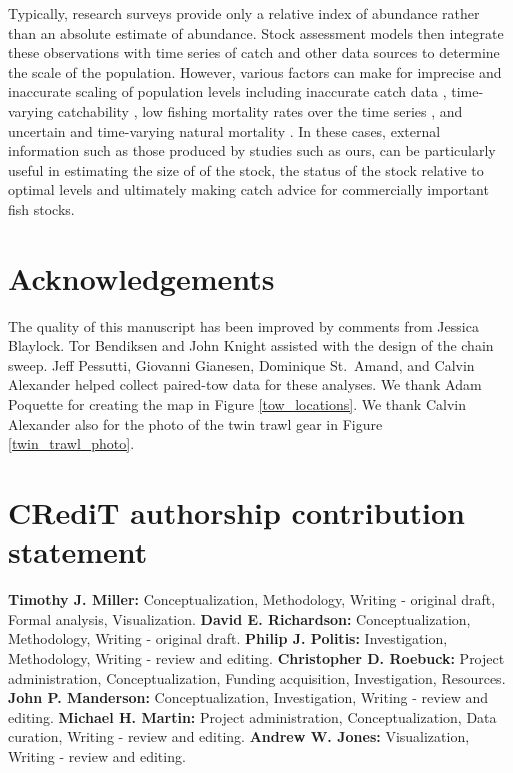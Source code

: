 \documentclass[
  12pt,
]{article}
\begin{document}
Typically, research surveys provide only a relative index of abundance
rather than an absolute estimate of abundance. Stock assessment models
then integrate these observations with time series of catch and other
data sources to determine the scale of the population. However, various
factors can make for imprecise and inaccurate scaling of population
levels including inaccurate catch data \citep{cadigan16}, time-varying
catchability \citep{wilbergetal09}, low fishing mortality rates over the
time series \citep{adamsetal14}, and uncertain and time-varying natural
mortality \citep{stocketal21}. In these cases, external information such
as those produced by studies such as ours, can be particularly useful in
estimating the size of of the stock, the status of the stock relative to
optimal levels and ultimately making catch advice for commercially
important fish stocks.

\hypertarget{acknowledgements}{%
\section*{Acknowledgements}\label{acknowledgements}}

The quality of this manuscript has been improved by comments from
Jessica Blaylock. Tor Bendiksen and John Knight assisted with the design
of the chain sweep. Jeff Pessutti, Giovanni Gianesen, Dominique
St.~Amand, and Calvin Alexander helped collect paired-tow data for these
analyses. We thank Adam Poquette for creating the map in Figure
\ref{tow_locations}. We thank Calvin Alexander also for the photo of the
twin trawl gear in Figure \ref{twin_trawl_photo}.

\hypertarget{credit-authorship-contribution-statement}{%
\section*{CRediT authorship contribution
statement}\label{credit-authorship-contribution-statement}}

\textbf{Timothy J. Miller:} Conceptualization, Methodology, Writing -
original draft, Formal analysis, Visualization. \textbf{David E.
Richardson:} Conceptualization, Methodology, Writing - original draft.
\textbf{Philip J. Politis:} Investigation, Methodology, Writing - review
and editing. \textbf{Christopher D. Roebuck:} Project administration,
Conceptualization, Funding acquisition, Investigation, Resources.
\textbf{John P. Manderson:} Conceptualization, Investigation, Writing -
review and editing. \textbf{Michael H. Martin:} Project administration,
Conceptualization, Data curation, Writing - review and editing.
\textbf{Andrew W. Jones:} Visualization, Writing - review and editing.
\end{document}

